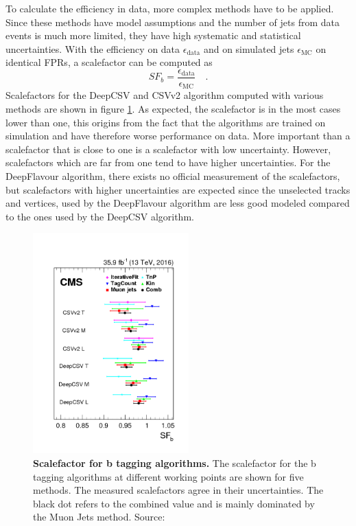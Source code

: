To calculate the efficiency in data, more complex methods have to be applied. Since these methods have model assumptions and the number of jets from data events is much more limited, they have high systematic and statistical uncertainties. With the efficiency on data $\epsilon_\textrm{data}$ and on simulated jets $\epsilon_\textrm{MC}$ on identical FPRs, a scalefactor can be computed as
\begin{equation}
SF_b = \frac{\epsilon_\textrm{data}}{\epsilon_\textrm{MC}} \quad .
\end{equation}
Scalefactors for the DeepCSV and CSVv2 algorithm computed with various methods are shown in figure \ref{fig:ch_5_Scalefactor}. As expected, the scalefactor is in the most cases lower than one, this origins from the fact that the algorithms are trained on simulation and have therefore worse performance on data. More important than a scalefactor that is close to one is a scalefactor with low uncertainty. However, scalefactors which are far from one tend to have higher uncertainties. For the DeepFlavour algorithm, there exists no official measurement of the scalefactors, but scalefactors with higher uncertainties are expected since the unselected tracks and vertices, used by the DeepFlavour algorithm are less good modeled compared to the ones used by the DeepCSV algorithm.

\begin{figure}
\centering
\includegraphics[width=6cm]{assets/SF.png}
\caption[Scalefactors for b Tagging Algorithms]{\textbf{Scalefactor for b tagging algorithms.} The scalefactor for the b tagging algorithms at different working points are shown for five methods. The measured scalefactors agree in their uncertainties. The black dot refers to the combined value and is mainly dominated by the Muon Jets method. Source: \cite{HeavyFlavorIdentification}}
\label{fig:ch_5_Scalefactor}
\end{figure}
